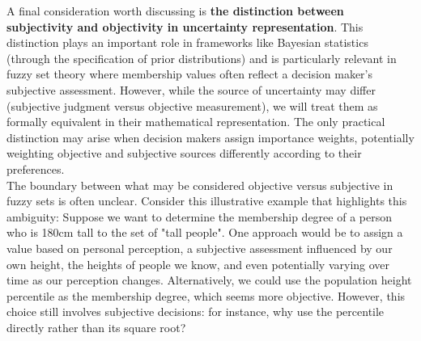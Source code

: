 A final consideration worth discussing is \textbf{the distinction between subjectivity and objectivity in uncertainty representation}. 
This distinction plays an important role in frameworks like Bayesian statistics (through the specification of prior distributions) and is particularly relevant in fuzzy set theory where membership values often reflect a decision maker's subjective assessment. However, while the source of uncertainty may differ (subjective judgment versus objective measurement), we will treat them as formally equivalent in their mathematical representation. The only practical distinction may arise when decision makers assign importance weights, potentially weighting objective and subjective sources differently according to their preferences.\\

The boundary between what may be considered objective versus subjective in fuzzy sets is often unclear. Consider this illustrative example that highlights this ambiguity:
Suppose we want to determine the membership degree of a person who is 180cm tall to the set of "tall people". One approach would be to assign a value based on personal perception, a subjective assessment influenced by our own height, the heights of people we know, and even potentially varying over time as our perception changes. Alternatively, we could use the population height percentile as the membership degree, which seems more objective. However, this choice still involves subjective decisions: for instance, why use the percentile directly rather than its square root?\\